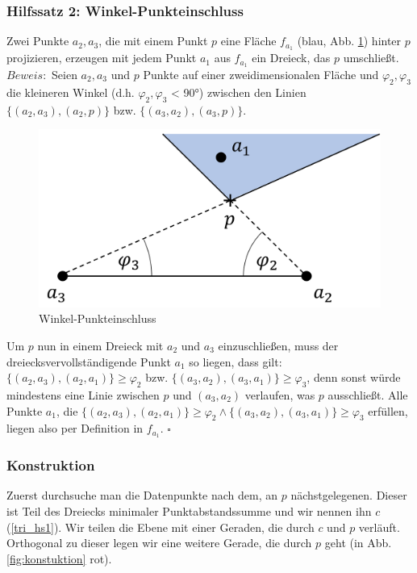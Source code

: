 \documentclass[a4paper]{extarticle}
\begin{document}
    \subsubsection{Hilfssatz 2: Winkel-Punkteinschluss} \label{tri_hs2}
    Zwei Punkte $a_2, a_3$, die mit einem Punkt $p$ eine Fläche $f_{a_1}$ (blau, Abb. 
    \ref{fig:triangulation_hilfssatz_2}) hinter $p$ projizieren, 
    erzeugen mit jedem Punkt $a_1$ aus $f_{a_1}$ ein Dreieck, das $p$ umschließt. \\
    $Beweis:$ Seien $a_2, a_3$ und $p$ Punkte auf einer zweidimensionalen Fläche und $\varphi_2, 
    \varphi_3$ die kleineren Winkel (d.h. $\varphi_2, \varphi_3$ < 90°) zwischen den Linien 
    $ \{ (a_2,a_3),(a_2,p) \} $ bzw. $ \{ (a_3,a_2),(a_3,p) \} $.
    
    \begin{figure}[!ht]
        \centering	
        \includegraphics[scale=0.15]{bilder/tri_hilfssatz.pdf}
        \caption{Winkel-Punkteinschluss}
        \label{fig:triangulation_hilfssatz_2}
    \end{figure}

    Um $p$ nun in einem Dreieck mit $a_2$ und $a_3$ einzuschließen, muss der 
    dreiecksvervollständigende Punkt $a_1$ so liegen, dass gilt:
    $ \{ (a_2,a_3),(a_2,a_1) \} \geq \varphi_2 $ bzw. $ \{ (a_3,a_2),(a_3,a_1) \} \geq \varphi_3 $, 
    denn sonst würde mindestens eine Linie zwischen $p$ und $(a_3,a_2)$ verlaufen, was $p$ 
    ausschließt. Alle Punkte $a_1$, die 
    $ \{ (a_2,a_3),(a_2,a_1) \} \geq \varphi_2 \land \{ (a_3,a_2),(a_3,a_1) \} \geq \varphi_3 $ 
    erfüllen, liegen also per Definition in $f_{a_1}$. $\square$

    \subsubsection{Konstruktion} \label{tri_k}
    Zuerst durchsuche man die Datenpunkte nach dem, an $p$ nächstgelegenen. Dieser ist Teil des 
    Dreiecks minimaler Punktabstandssumme und wir nennen ihn $c$ (\ref{tri_hs1}). Wir teilen die 
    Ebene mit einer Geraden, die durch $c$ und $p$ verläuft. Orthogonal zu dieser legen wir eine 
    weitere Gerade, die durch $p$ geht (in Abb. \ref{fig:konstuktion} rot). 
\end{document}
